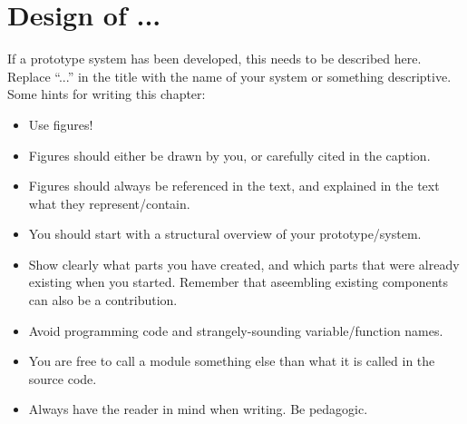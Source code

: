 \chapter{Design of ...}
\label{cha:design}

If a prototype system has been developed, this needs to be described here. Replace ``...'' in the title with the name of your system or something descriptive. Some hints for writing this chapter:

\begin{itemize}
\item Use figures!
\item Figures should either be drawn by you, or carefully cited in the caption.
\item Figures should always be referenced in the text, and explained in the text what they represent/contain.
\item You should start with a structural overview of your prototype/system.
\item Show clearly what parts you have created, and which parts that were already existing when you started. Remember that aseembling existing components can also be a contribution.
\item Avoid programming code and strangely-sounding variable/function names.
\item You are free to call a module something else than what it is called in the source code.
\item Always have the reader in mind when writing. Be pedagogic.
\end{itemize}


